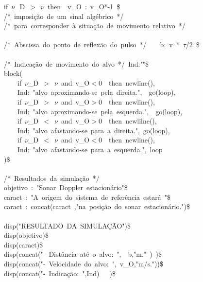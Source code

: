 \documentclass[fleqn]{article}
\begin{document}
\begin{minipage}[t]{\textwidth}
if\ \ensuremath{\nu}\_D\ \ensuremath{>}\ \ensuremath{\nu}\ then\ \ v\_O\ :\ v\_O*-1\ \$\\
/*\ imposição\ de\ um\ sinal\ algébrico\ */\\
/*\ para\ corresponder\ à\ situação\ de\ movimento\ relativo\ */\\
\\
/*\ Abscissa\ do\ ponto\ de\ reflexão\ do\ pulso\ */\ \ \ \ b:\ v\ *\ \ensuremath{\tau}/2\ \$\\
\\
/*\ Indicação\ de\ movimento\ do\ alvo\ */\ Ind:""\$\\
block(\\
\ \ \ \ if\ \ensuremath{\nu}\_D\ \ensuremath{>}\ \ensuremath{\nu}\ and\ v\_O\ensuremath{<}0\ \ then\ newline(),\\
\ \ \ \ Ind:\ "alvo\ aproximando-se\ pela\ direita.",\ \ go(loop),\\
\ \ \ \ if\ \ensuremath{\nu}\_D\ \ensuremath{>}\ \ensuremath{\nu}\ and\ v\_O\ensuremath{>}0\ \ then\ newline(),\\
\ \ \ \ Ind:\ "alvo\ aproximando-se\ pela\ esquerda.",\ \ go(loop),\\
\ \ \ \ if\ \ensuremath{\nu}\_D\ \ensuremath{<}\ \ensuremath{\nu}\ and\ v\_O\ensuremath{>}0\ \ then\ newlilne(),\\
\ \ \ \ Ind:\ "alvo\ afastando-se\ para\ a\ direita.",\ go(loop),\\
\ \ \ \ if\ \ensuremath{\nu}\_D\ \ensuremath{<}\ \ensuremath{\nu}\ and\ v\_O\ensuremath{<}0\ \ then\ newline(),\\
\ \ \ \ Ind:\ "alvo\ afastando-se\ para\ a\ esquerda.",\ loop\\
)\$\\
\\
/*\ Resultados\ da\ simulação\ */\\
objetivo\ :\ "Sonar\ Doppler\ estacionário"\$\\
caract\ :\ "A\ origem\ do\ sistema\ de\ referência\ estará\ "\$\\
caract\ :\ concat(caract\ ,"na\ posição\ do\ sonar\ estacionário.")\$\\
\\
disp("RESULTADO\ DA\ SIMULAÇÃO")\$\\
disp(objetivo)\$\\
disp(caract)\$\\
disp(concat("-\ Distância\ até\ o\ alvo:\ ",\ \ b,"m."\ )\ )\$\\
disp(concat("-\ Velocidade\ do\ alvo:\ ",\ v\_O,"m/s."))\$\\
disp(concat("-\ Indicação:\ ",Ind)\ \ \ )\$
\end{minipage}

\noindent%
\end{document}
